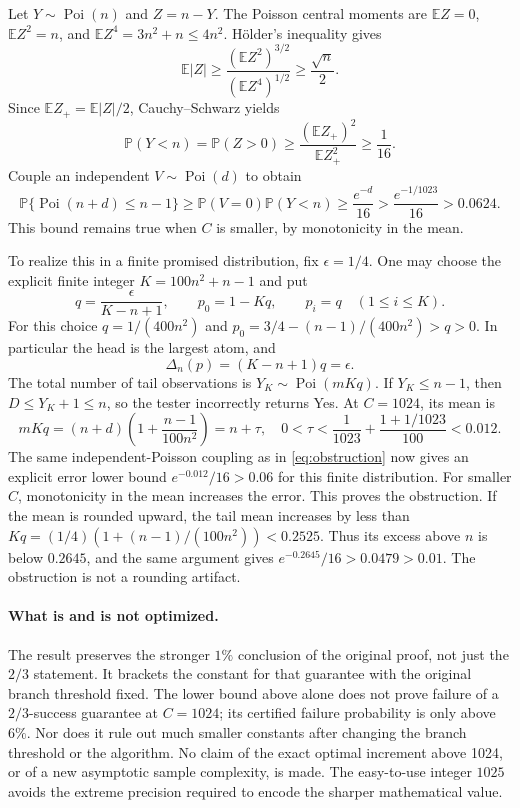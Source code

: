 \documentclass[11pt]{article}
\newcommand{\E}{\mathbb E}
\newcommand{\Prb}{\mathbb P}
\newcommand{\Poi}{\operatorname{Poi}}
\begin{document}
Let $Y\sim\Poi(n)$ and $Z=n-Y$. The Poisson central moments are
$\E Z=0$, $\E Z^2=n$, and $\E Z^4=3n^2+n\le4n^2$.
H\"older's inequality gives
\[
 \E|Z|\ge\frac{(\E Z^2)^{3/2}}{(\E Z^4)^{1/2}}\ge\frac{\sqrt n}{2}.
\]
Since $\E Z_+=\E|Z|/2$, Cauchy--Schwarz yields
\[
 \Prb(Y<n)=\Prb(Z>0)
 \ge\frac{(\E Z_+)^2}{\E Z_+^2}\ge\frac1{16}.
\]
Couple an independent $V\sim\Poi(d)$ to obtain
\begin{equation}
 \Prb\{\Poi(n+d)\le n-1\}
 \ge\Prb(V=0)\Prb(Y<n)
 \ge\frac{e^{-d}}{16}>\frac{e^{-1/1023}}{16}>0.0624.
 \label{eq:obstruction}
\end{equation}
This bound remains true when $C$ is smaller, by monotonicity in the mean.

To realize this in a finite promised distribution, fix $\epsilon=1/4$.
One may choose the explicit finite integer $K=100n^2+n-1$ and put
\[
 q=\frac{\epsilon}{K-n+1},\qquad
 p_0=1-Kq,\qquad p_i=q\quad(1\le i\le K).
\]
For this choice $q=1/(400n^2)$ and
$p_0=3/4-(n-1)/(400n^2)>q>0$. In particular the head is the largest
atom, and
\[
 \Delta_n(p)=(K-n+1)q=\epsilon.
\]
The total number of tail observations is $Y_K\sim\Poi(mKq)$. If
$Y_K\le n-1$, then $D\le Y_K+1\le n$, so the tester incorrectly returns
Yes. At $C=1024$, its mean is
\[
 mKq=(n+d)\left(1+\frac{n-1}{100n^2}\right)=n+\tau,
 \quad
 0<\tau<\frac1{1023}+\frac{1+1/1023}{100}<0.012.
\]
The same independent-Poisson coupling as in \eqref{eq:obstruction} now gives
an explicit error lower bound $e^{-0.012}/16>0.06$ for this finite
distribution. For smaller $C$, monotonicity in the mean increases the error.
This proves the obstruction.
If the mean is rounded upward, the tail mean increases by less than
$Kq=(1/4)(1+(n-1)/(100n^2))<0.2525$.
Thus its excess above $n$ is below $0.2645$, and the same argument gives
$e^{-0.2645}/16>0.0479>0.01$. The obstruction is not a rounding artifact.

\paragraph{What is and is not optimized.}
The result preserves the stronger $1\%$ conclusion of the original proof,
not just the $2/3$ statement. It brackets the constant for that guarantee
with the original branch threshold fixed. The lower bound above alone does
not prove failure of a $2/3$-success guarantee at $C=1024$; its certified
failure probability is only above $6\%$. Nor does it rule out much smaller
constants after changing the branch threshold or the algorithm. No claim
of the exact optimal increment above 1024, or of a new asymptotic sample
complexity, is made. The easy-to-use integer $1025$ avoids the extreme
precision required to encode the sharper mathematical value.
\end{document}
